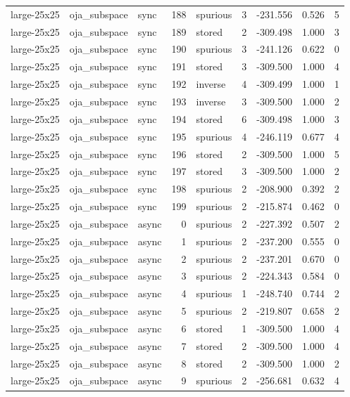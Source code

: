 \begin{tabular}{lllrlrrrr}
large-25x25 & oja\_subspace & sync & 188 & spurious & 3 & -231.556 & 0.526 & 5 \\
large-25x25 & oja\_subspace & sync & 189 & stored & 2 & -309.498 & 1.000 & 3 \\
large-25x25 & oja\_subspace & sync & 190 & spurious & 3 & -241.126 & 0.622 & 0 \\
large-25x25 & oja\_subspace & sync & 191 & stored & 3 & -309.500 & 1.000 & 4 \\
large-25x25 & oja\_subspace & sync & 192 & inverse & 4 & -309.499 & 1.000 & 1 \\
large-25x25 & oja\_subspace & sync & 193 & inverse & 3 & -309.500 & 1.000 & 2 \\
large-25x25 & oja\_subspace & sync & 194 & stored & 6 & -309.498 & 1.000 & 3 \\
large-25x25 & oja\_subspace & sync & 195 & spurious & 4 & -246.119 & 0.677 & 4 \\
large-25x25 & oja\_subspace & sync & 196 & stored & 2 & -309.500 & 1.000 & 5 \\
large-25x25 & oja\_subspace & sync & 197 & stored & 3 & -309.500 & 1.000 & 2 \\
large-25x25 & oja\_subspace & sync & 198 & spurious & 2 & -208.900 & 0.392 & 2 \\
large-25x25 & oja\_subspace & sync & 199 & spurious & 2 & -215.874 & 0.462 & 0 \\
large-25x25 & oja\_subspace & async & 0 & spurious & 2 & -227.392 & 0.507 & 2 \\
large-25x25 & oja\_subspace & async & 1 & spurious & 2 & -237.200 & 0.555 & 0 \\
large-25x25 & oja\_subspace & async & 2 & spurious & 2 & -237.201 & 0.670 & 0 \\
large-25x25 & oja\_subspace & async & 3 & spurious & 2 & -224.343 & 0.584 & 0 \\
large-25x25 & oja\_subspace & async & 4 & spurious & 1 & -248.740 & 0.744 & 2 \\
large-25x25 & oja\_subspace & async & 5 & spurious & 2 & -219.807 & 0.658 & 2 \\
large-25x25 & oja\_subspace & async & 6 & stored & 1 & -309.500 & 1.000 & 4 \\
large-25x25 & oja\_subspace & async & 7 & stored & 2 & -309.500 & 1.000 & 4 \\
large-25x25 & oja\_subspace & async & 8 & stored & 2 & -309.500 & 1.000 & 2 \\
large-25x25 & oja\_subspace & async & 9 & spurious & 2 & -256.681 & 0.632 & 4 \\

\end{tabular}
